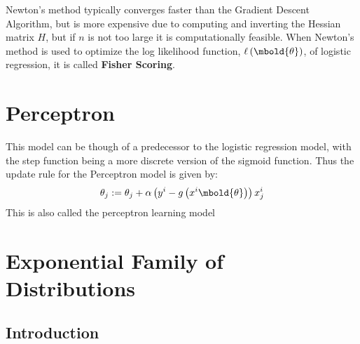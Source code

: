 \documentclass[12pt letter]{report}
\begin{document}
Newton's method typically converges faster than the Gradient Descent Algorithm, but is more expensive due to computing
and inverting the Hessian matrix $H$, but if $n$ is not too large it is computationally feasible. When Newton's method
is used to optimize the log likelihood function, $\ell \left( \mbold{\theta} \right) $, of logistic regression, it is called \textbf{Fisher Scoring}.

\chapter{Perceptron}


This model can be though of a predecessor to the logistic regression model, with the step function being a more discrete
version of the sigmoid function. Thus the update rule for the Perceptron model is given by:
\[
  \theta_j := \theta_j + \alpha \left( y^{i} - g \left( x^{i} \mbold{\theta} \right) \right) x^{i}_j
\]
This is also called the perceptron learning model


\chapter{Exponential Family of Distributions}

\section{Introduction}
\end{document}
